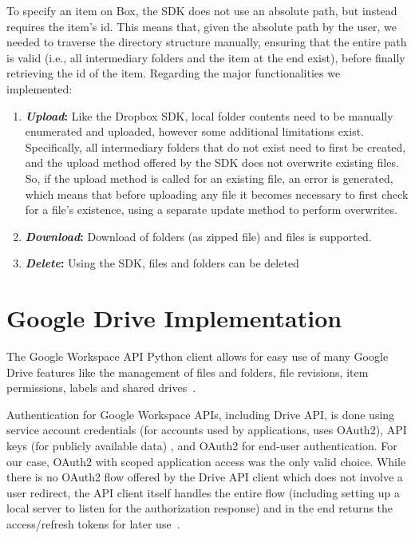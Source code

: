 To specify an item on Box, the SDK does not use an absolute path, but instead requires the item's id. This means that, given the absolute path by the user, we needed to traverse the directory structure manually, ensuring that the entire path is valid (i.e., all intermediary folders and the item at the end exist), before finally retrieving the id of the item. Regarding the major functionalities we implemented: ~\cite{box_docs}


\begin{enumerate}
    \item \textbf{\textit{Upload}:} Like the Dropbox SDK, local folder contents need to be manually enumerated and uploaded, however some additional limitations exist. Specifically, all intermediary folders that do not exist need to first be created, and the upload method offered by the SDK does not overwrite existing files. So, if the upload method is called for an existing file, an error is generated, which means that before uploading any file it becomes necessary to first check for a file's existence, using a separate update method to perform overwrites.

    \item \textbf{\textit{Download}:} Download of folders (as zipped file) and files is supported.

    \item \textbf{\textit{Delete}:} Using the SDK, files and folders can be deleted
\end{enumerate}


\section{Google Drive Implementation}
The Google Workspace API Python client allows for easy use of many Google Drive features like the management of files and folders, file revisions, item permissions, labels and shared drives~\cite{drive_docs}.

Authentication for Google Workspace APIs, including Drive API, is done using service account credentials (for accounts used by applications, uses OAuth2), API keys (for publicly available data) , and OAuth2 for end-user authentication. For our case, OAuth2 with scoped application access was the only valid choice. While there is no OAuth2 flow offered by the Drive API client which does not involve a user redirect, the API client itself handles the entire flow (including setting up a local server to listen for the authorization response) and in the end returns the access/refresh tokens for later use~\cite{drive_auth}.

